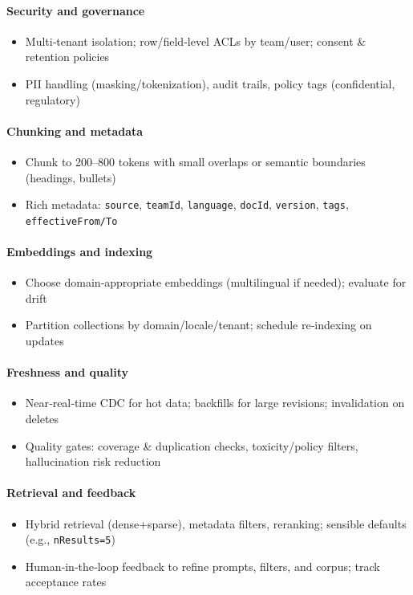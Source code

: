 \documentclass[11pt,a4paper]{article}
\begin{document}
\paragraph{Security and governance}
\begin{itemize}[leftmargin=*]
  \item Multi‑tenant isolation; row/field‑level ACLs by team/user; consent \& retention policies
  \item PII handling (masking/tokenization), audit trails, policy tags (confidential, regulatory)
\end{itemize}

\paragraph{Chunking and metadata}
\begin{itemize}[leftmargin=*]
  \item Chunk to 200–800 tokens with small overlaps or semantic boundaries (headings, bullets)
  \item Rich metadata: \texttt{source}, \texttt{teamId}, \texttt{language}, \texttt{docId}, \texttt{version}, \texttt{tags}, \texttt{effectiveFrom/To}
\end{itemize}

\paragraph{Embeddings and indexing}
\begin{itemize}[leftmargin=*]
  \item Choose domain‑appropriate embeddings (multilingual if needed); evaluate for drift
  \item Partition collections by domain/locale/tenant; schedule re‑indexing on updates
\end{itemize}

\paragraph{Freshness and quality}
\begin{itemize}[leftmargin=*]
  \item Near‑real‑time CDC for hot data; backfills for large revisions; invalidation on deletes
  \item Quality gates: coverage \& duplication checks, toxicity/policy filters, hallucination risk reduction
\end{itemize}

\paragraph{Retrieval and feedback}
\begin{itemize}[leftmargin=*]
  \item Hybrid retrieval (dense+sparse), metadata filters, reranking; sensible defaults (e.g., \texttt{nResults=5})
  \item Human‑in‑the‑loop feedback to refine prompts, filters, and corpus; track acceptance rates
\end{itemize}
\end{document}
